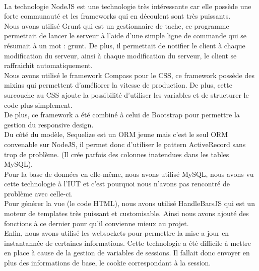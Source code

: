 \paragraph{}
La technologie NodeJS est une technologie très intéressante car elle possède une forte communauté et les frameworks qui en découlent sont très puissants. \\
Nous avons utilisé Grunt qui est un gestionnaire de tache, ce programme permettait de lancer le serveur à l'aide d'une simple ligne de commande qui se résumait à un mot : grunt. De plus, il permettait de notifier le client à chaque modification du serveur, ainsi à chaque modification du serveur, le client se raffraichit automatiquement. \\
Nous avons utilisé le framework Compass pour le CSS, ce framework possède des mixins qui permettent d'améliorer la vitesse de production. De plus, cette surcouche au CSS ajoute la possibilité d'utiliser les variables et de structurer le code plus simplement. \\ De plus, ce framework a été combiné à celui de Bootstrap pour permettre la gestion du responsive design. \\
Du côté du modèle, Sequelize est un ORM jeune mais c'est le seul ORM convenable sur NodeJS, il permet donc d'utiliser le pattern ActiveRecord sans trop de problème. (Il crée parfois des colonnes inatendues dans les tables MySQL). \\
Pour la base de données en elle-même, nous avons utilisé MySQL, nous avons vu cette technologie à l'IUT et c'est pourquoi nous n'avons pas rencontré de problème avec celle-ci. \\
Pour générer la vue (le code HTML), nous avons utilisé HandleBarsJS qui est un moteur de templates très puissant et customisable. Ainsi nous avons ajouté des fonctions à ce dernier pour qu'il convienne mieux au projet. \\
Enfin, nous avons utilisé les websockets pour permettre la mise a jour en instantannée de certaines informations. Cette technologie a été difficile à mettre en place à cause de la gestion de variables de sessions. Il fallait donc envoyer en plus des informations de base, le cookie correspondant à la session.

